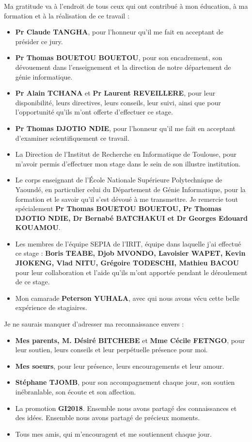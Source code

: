 \begin{SingleSpace}
Ma gratitude va à l'endroit de tous ceux qui ont contribué à mon éducation, à ma formation et à la réalisation de ce travail :

\begin{itemize}
	\item \textbf{Pr Claude TANGHA}, pour l’honneur qu’il me fait en acceptant de présider ce jury.
    \item \textbf{Pr Thomas BOUETOU BOUETOU}, pour son encadrement, son dévouement dans l'enseignement et la direction de notre département de génie informatique.
    \item \textbf{Pr Alain TCHANA} et \textbf{Pr Laurent REVEILLERE}, pour leur disponibilité, leurs directives, leurs conseils, leur suivi, ainsi que pour l’opportunité qu’ils m’ont offerte d’effectuer ce stage.
    \item \textbf{Pr Thomas DJOTIO NDIE}, pour l’honneur qu’il me fait en acceptant d’examiner scientifiquement ce travail. 
    \item La Direction de l’Institut de Recherche en Informatique de Toulouse, pour m’avoir permis d’effectuer mon stage dans le sein de son illustre institution.
    \item Le corps enseignant de l’École Nationale Supérieure Polytechnique de Yaoundé, en particulier celui du Département de Génie Informatique, pour la formation et le savoir qu’il s’est dévoué à me transmettre. Je remercie tout spécialement \textbf{Pr Thomas BOUETOU BOUETOU, Pr Thomas DJOTIO NDIE, Dr Bernabé BATCHAKUI et Dr Georges Edouard KOUAMOU}.
    \item Les membres de l’équipe SEPIA de l’IRIT, équipe dans laquelle j’ai effectué ce \break stage : \textbf{Boris TEABE, Djob MVONDO, Lavoisier WAPET, Kevin JIOKENG, Vlad NITU, Grégoire TODESCHI, Mathieu BACOU} pour leur collaboration et l’aide qu’ils m’ont apportée pendant le déroulement de ce stage.
    \item Mon camarade \textbf{Peterson YUHALA}, avec qui nous avons vécu cette belle \break expérience de stagiaires.
\end{itemize}

\noindent Je ne saurais manquer d'adresser ma reconnaissance envers : 
\begin{itemize}
	\item \textbf{Mes parents, M. Désiré BITCHEBE} et \textbf{Mme Cécile FETNGO}, pour leur soutien, leurs conseils et leur perpétuelle présence pour moi.
	\item \textbf{Mes soeurs}, pour leur présence, leurs encouragements et leur amour.
    \item \textbf{Stéphane TJOMB}, pour son accompagnement chaque jour, son soutien inébranlable, son écoute et son affection.
    \item La promotion \textbf{GI2018}. Ensemble nous avons partagé des connaissances et des idées. Ensemble nous avons partagé de précieux moments. 
    \item Tous mes amis, qui m’encouragent et me soutiennent chaque jour.
\end{itemize}
\end{SingleSpace}
\clearpage
